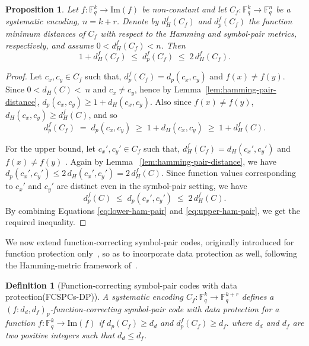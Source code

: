 \documentclass[11pt,draftclsnofoot,journal,onecolumn]{IEEEtran}
\newtheorem{definition}{Definition}
\newtheorem{proposition}{Proposition}
\newcommand{\Img}{\mathrm{Im}}
\begin{document}
    \begin{proposition}
    \label{prop:pair-hamming-func-dist-reln}
    Let $f : \mathbb{F}_q^k \to \mathrm{Im}(f)$ be non-constant and let $C_f : \mathbb{F}_q^k \to \mathbb{F}_q^{n}$ be a systematic encoding, $n = k+r$. Denote by $d_H^f(C_f)$ and $d_p^f(C_f)$ the function minimum distances of $C_f$ with respect to the Hamming and symbol-pair metrics, respectively, and assume $0 < d_H^f(C_f) < n$. Then
    \[
    1 + d_H^f(C_f) \;\leq\; d_p^f(C_f) \;\leq\; 2\, d_H^f(C_f).
    \]
    \end{proposition}
    
    
    \begin{proof}
    Let $c_x, c_y \in C_f$ such that, $d_p^f(C_f) = d_p(c_x, c_y)$ and $f(x) \neq f(y)$. Since $0 < d_H(C) <~n$ and $c_x \neq c_y$, hence by Lemma~\ref{lem:hamming-pair-distance}, $d_p(c_x, c_y) \geq 1 + d_H(c_x, c_y)$. Also since $f(x) \neq f(y)$, $d_H(c_x, c_y) \geq d_H^f(C)$, and so
    \begin{equation}
    \label{eq:lower-ham-pair}
        d_p^f(C_f) \;=\; d_p(c_x, c_y) \;\geq\; 1 + d_H(c_x, c_y) \;\geq\; 1 + d_H^f(C).
    \end{equation}
    
    \noindent
    For the upper bound, let $c_x', c_y' \in C_f$ such that, $d_H^f(C_f) = d_H(c_x', c_y')$ and $f(x) \neq f(y)$ . Again by  Lemma ~\ref{lem:hamming-pair-distance}, we have $d_p(c_x', c_y')\leq 2\, d_H(c_x', c_y') = 2\, d_H^f(C)$. Since function values corresponding to $c_x'$ and $ c_y'$ are distinct even in the symbol-pair setting, we have
    \begin{equation}
    \label{eq:upper-ham-pair}
        d_p^f(C) \;\leq\; d_p(c_x', c_y') \;\leq\; 2\, d_H^f(C).
    \end{equation}
    By combining Equations \ref{eq:lower-ham-pair} and \ref{eq:upper-ham-pair}, we get the required inequality.
    \end{proof}
        
    
    

    
    
    We now extend function-correcting symbol-pair codes, originally introduced for function protection only~\cite{xia2024function}, so as to incorporate data protection as well, following the Hamming-metric framework of~\cite{rajput2025function}.

    \begin{definition}[Function-correcting symbol-pair codes with data protection(FCSPCs-DP)]
    \label{def:FCSPC-DP}
        A systematic encoding $C_f: \mathbb{F}_q^k \rightarrow \mathbb{F}_q^{k+r}$ defines a $(f: d_d, d_f)_p$-function-correcting symbol-pair code with data protection for a function $f:\mathbb{F}_q^k \rightarrow \Img(f)$  if $d_p(C_f) \geq d_d$ and $d_p^f(C_f) \geq d_f.$
        where $d_d$ and $d_f$ are two positive integers such that $d_d \leq d_f$.
    \end{definition}
\end{document}
